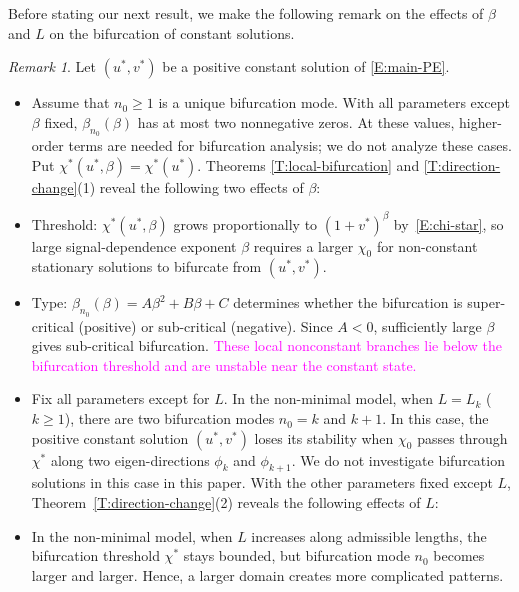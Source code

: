 \documentclass[11pt]{article} %
\theoremstyle{remark}
\newtheorem{remark}{Remark}[section]
\theoremstyle{remark}
\numberwithin{equation}{section}
\numberwithin{figure}{section}
\numberwithin{table}{section}
\begin{document}
Before stating our next result, we make the following remark on the effects of
$\beta$ and $L$ on the bifurcation of constant solutions.


\begin{remark}
  Let $(u^*,v^*)$ be a positive constant solution of \eqref{E:main-PE}.
  \begin{itemize}
    \item[(1)] Assume that $n_0 \ge 1$ is  a unique bifurcation mode.
      With all parameters except $\beta$ fixed, $\beta_{n_0}(\beta)$ has at most
      two nonnegative zeros. At these values, higher-order terms are needed for
      bifurcation analysis; we do not analyze these cases. Put
      $\chi^*(u^*,\beta) = \chi^*(u^*)$. Theorems \ref{T:local-bifurcation}
      and \ref{T:direction-change}(1)
      reveal the following two effects of $\beta$:
    \item[-] {Threshold:} $\chi^*(u^*,\beta)$ grows proportionally to $(1 +
      v^*)^\beta$ by~\eqref{E:chi-star}, so  large signal-dependence exponent $\beta$
      requires a
      larger $\chi_0$ for non-constant stationary solutions to bifurcate from $(u^*,v^*)$.
    \item[-] {Type:} $\beta_{n_0}(\beta) = A\beta^2 + B\beta + C$ determines
      whether the bifurcation is super-critical (positive) or sub-critical
      (negative). Since $A < 0$, sufficiently large $\beta$ gives sub-critical
      bifurcation. \textcolor{magenta}{These local nonconstant branches lie below the bifurcation threshold and are unstable near the constant state.}


    \item[(2)] Fix all parameters except for $L$. In the non-minimal model, when
      $L = L_k$ ($k \ge 1$), there are two bifurcation modes {$n_0=k$ and $k +
      1$.}  In this case, the positive constant solution $(u^*,v^*)$ loses its
      stability when $\chi_0$ passes through $\chi^*$ along two eigen-directions
      $\phi_{k}$ and $\phi_{k+1}$. We do not investigate bifurcation solutions
      in this case in this paper. With the other parameters fixed except $L$,
      Theorem~\ref{T:direction-change}(2) reveals the following effects of $L$:


    \item[-] In the non-minimal model, when $L$ increases along admissible lengths, the bifurcation
      threshold $\chi^*$ stays bounded, but bifurcation mode $n_0$ becomes
      larger and larger. Hence, a larger domain creates more complicated
      patterns.


\end{itemize}
\end{remark}
\end{document}
